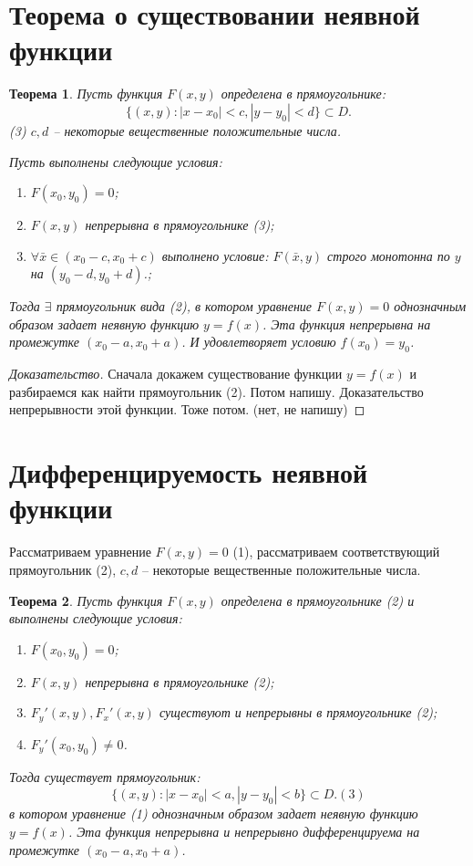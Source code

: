 \documentclass{article}
\theoremstyle{plain}
\newtheorem{theorem}{Теорема}
\theoremstyle{definition}
\theoremstyle{remark}
\begin{document}
\section*{Теорема о существовании неявной функции}
\begin{theorem}
    Пусть функция $F(x, y)$ определена в прямоугольнике:
    \[\{(x, y) : |x - x_0| < c, |y - y_0| < d\} \subset D.\] (3)
$c, d$ -- некоторые вещественные положительные числа.

    Пусть выполнены следующие условия:
    \begin{enumerate}
        \item $F(x_0, y_0) = 0$;
        \item $F(x, y)$ непрерывна в прямоугольнике (3);
        \item $\forall \bar{x} \in (x_0 - c, x_0 + c)$ выполнено условие: 
        $F(\bar{x}, y)$ строго монотонна по $y$ на $(y_0 - d, y_0 + d)$.;
    \end{enumerate}
    Тогда $\exists$ прямоугольник вида (2), в котором уравнение $F(x, y) = 0$ однозначным образом
    задает неявную функцию $y = f(x)$. Эта функция непрерывна на промежутке
    $(x_0 - a, x_0 + a)$. И удовлетворяет условию $f(x_0) = y_0$.
\end{theorem}

\begin{proof}[Доказательство]
Сначала докажем существование функции $y = f(x)$ и разбираемся как найти
прямоугольник (2).
Потом напишу.
Доказательство непрерывности этой функции.
Тоже потом. (нет, не напишу)
\end{proof}

\section*{Дифференцируемость неявной функции}
Рассматриваем уравнение $F(x, y) = 0$ (1), рассматриваем соответствующий
прямоугольник (2), $c, d$ -- некоторые вещественные положительные числа.
\begin{theorem}
    Пусть функция $F(x, y)$ определена в прямоугольнике (2) и выполнены следующие условия:
    \begin{enumerate}
        \item $F(x_0, y_0) = 0$;
        \item $F(x, y)$ непрерывна в прямоугольнике (2);
        \item $F_y'(x, y), F_x'(x, y)$ существуют и непрерывны в прямоугольнике (2);
        \item $F_y'(x_0, y_0) \neq 0$.
    \end{enumerate}
    Тогда существует прямоугольник:
    \[\{(x, y) : |x - x_0| < a, |y - y_0| < b\} \subset D. (3)\]
    в котором уравнение (1) однозначным образом задает неявную функцию
    $y = f(x)$. Эта функция непрерывна и непрерывно дифференцируема на промежутке
    $(x_0 - a, x_0 + a)$.
\end{theorem}
\end{document}
